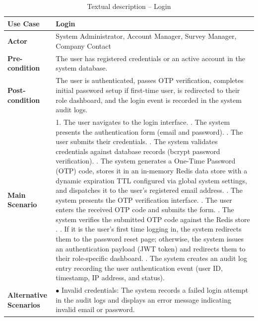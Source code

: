 \documentclass[12pt,a4paper]{report}
\begin{document}
\begin{table}[H]
\centering
\caption{Textual description -- Login}
\label{tab:refinement_login}
\vspace{0.2cm}
\small
\renewcommand{\arraystretch}{1.1}
\begin{tabular}{|p{3.5cm}|p{12.0cm}|}
\hline
\textbf{Use Case} & Login \\ \hline
\textbf{Actor} & System Administrator, Account Manager, Survey Manager, Company Contact \\ \hline
\textbf{Pre-condition} & The user has registered credentials or an active account in the system database. \\ \hline
\textbf{Post-condition} & The user is authenticated, passes OTP verification, completes initial password setup if first-time user, is redirected to their role dashboard, and the login event is recorded in the system audit logs. \\ \hline
\textbf{Main Scenario} & 
1. The user navigates to the login interface. \newline
2. The system presents the authentication form (email and password). \newline
3. The user submits their credentials. \newline
4. The system validates credentials against database records (bcrypt password verification). \newline
5. The system generates a One-Time Password (OTP) code, stores it in an in-memory Redis data store \cite{redis} with a dynamic expiration TTL configured via global system settings, and dispatches it to the user's registered email address. \newline
6. The system presents the OTP verification interface. \newline
7. The user enters the received OTP code and submits the form. \newline
8. The system verifies the submitted OTP code against the Redis store \cite{redis}. \newline
9. If it is the user's first time logging in, the system redirects them to the password reset page; otherwise, the system issues an authentication payload (JWT token) and redirects them to their role-specific dashboard. \newline
10. The system creates an audit log entry recording the user authentication event (user ID, timestamp, IP address, and status). \\ \hline
\textbf{Alternative Scenarios} & 
$\bullet$ Invalid credentials: The system records a failed login attempt in the audit logs and displays an error message indicating invalid email or password. \newline

\end{tabular}
\end{table}
\end{document}
